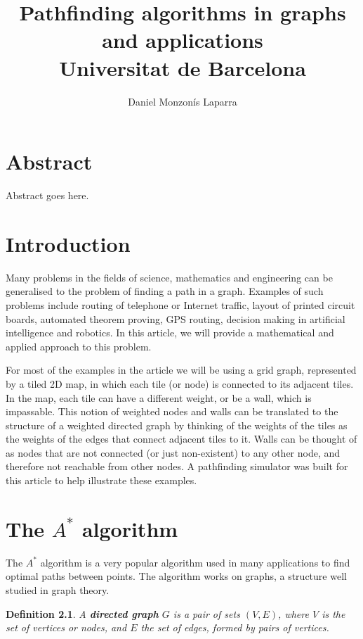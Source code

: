 \documentclass[12pt]{report}
\title{
{Pathfinding algorithms in graphs and applications}\\
{\large Universitat de Barcelona}
}
\author{Daniel Monzonís Laparra}
\newtheorem{definition}[theorem]{Definition}
\begin{document}
\maketitle

\chapter*{Abstract}
Abstract goes here.

\tableofcontents

\chapter{Introduction}
Many problems in the fields of science, mathematics and engineering can be generalised to the problem of finding a path in a graph. Examples of such problems include routing of telephone or Internet traffic, layout of printed circuit boards, automated theorem proving, GPS routing, decision making in artificial intelligence and robotics. In this article, we will provide a mathematical and applied approach to this problem.

For most of the examples in the article we will be using a grid graph, represented by a tiled 2D map, in which each tile (or node) is connected to its adjacent tiles. In the map, each tile can have a different weight, or be a wall, which is impassable. This notion of weighted nodes and walls can be translated to the structure of a weighted directed graph by thinking of the weights of the tiles as the weights of the edges that connect adjacent tiles to it. Walls can be thought of as nodes that are not connected (or just non-existent) to any other node, and therefore not reachable from other nodes. A pathfinding simulator was built for this article to help illustrate these examples.

\chapter{The $A^*$ algorithm}
\label{chapter:algorithms}
The $A^*$ algorithm is a very popular algorithm used in many applications to find optimal paths between points. The algorithm works on graphs, a structure well studied in graph theory.

\begin{definition}
A \textbf{directed graph} $G$ is a pair of sets $(V, E)$, where $V$ is the set of vertices or nodes, and $E$ the set of edges, formed by pairs of vertices.
\end{definition}
\end{document}

